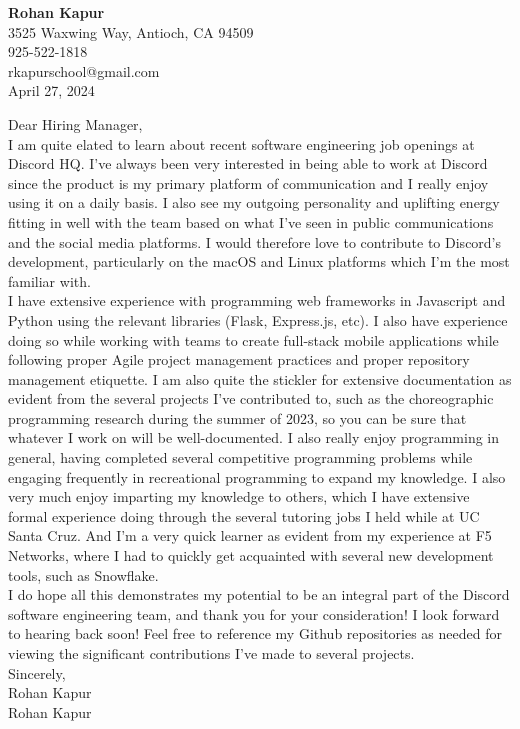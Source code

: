 \documentclass[letterpaper,12pt]{article}
\begin{document}
\begin{center}
  \textbf{Rohan Kapur} \\
  3525 Waxwing Way, Antioch, CA 94509 \\
  925-522-1818 \\
  rkapurschool@gmail.com \\
  April 27, 2024
\end{center}

\noindent
Dear Hiring Manager,\\
\indent I am quite elated to learn about recent software engineering job openings at Discord HQ. I've always been very interested in being able to work at Discord since the product is my primary platform of communication and I really enjoy using it on a daily basis. I also see my outgoing personality and uplifting energy fitting in well with the team based on what I've seen in public communications and the social media platforms. I would therefore love to contribute to Discord's development, particularly on the macOS and Linux platforms which I'm the most familiar with.\\
\indent I have extensive experience with programming web frameworks in Javascript and Python using the relevant libraries (Flask, Express.js, etc). I also have experience doing so while working with teams to create full-stack mobile applications while following proper Agile project management practices and proper repository management etiquette. I am also quite the stickler for extensive documentation as evident from the several projects I've contributed to, such as the choreographic programming research during the summer of 2023, so you can be sure that whatever I work on will be well-documented. I also really enjoy programming in general, having completed several competitive programming problems while engaging frequently in recreational programming to expand my knowledge. I also very much enjoy imparting my knowledge to others, which I have extensive formal experience doing through the several tutoring jobs I held while at UC Santa Cruz. And I'm a very quick learner as evident from my experience at F5 Networks, where I had to quickly get acquainted with several new development tools, such as Snowflake.\\
\indent I do hope all this demonstrates my potential to be an integral part of the Discord software engineering team, and thank you for your consideration! I look forward to hearing back soon! Feel free to reference my Github repositories as needed for viewing the significant contributions I've made to several projects. \\
Sincerely,\\
{\calligra Rohan Kapur}\\
Rohan Kapur
\end{document}
